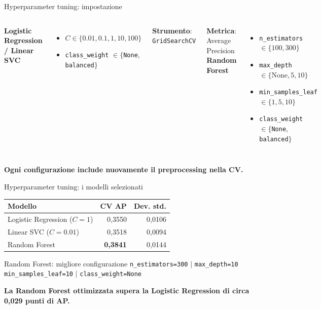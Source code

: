 \documentclass[10pt,aspectratio=169]{beamer}
\newcommand{\keypoint}[1]{\par\vspace{0.45em}\noindent{\color{teal}\rule{2.4pt}{1.25em}}\hspace{0.7em}\parbox[t]{0.92\linewidth}{\raggedright\textbf{#1}}}
\newcommand{\tightitems}{\setlength{\itemsep}{.5em}}
\begin{document}
\begin{frame}{Hyperparameter tuning: impostazione}
\begin{columns}[T,onlytextwidth]
\textbf{Logistic Regression / Linear SVC}
\begin{itemize}\tightitems
\item $C\in\{0.01,0.1,1,10,100\}$
\item \texttt{class\_weight} $\in\{$\texttt{None}, \texttt{balanced}$\}$
\end{itemize}
\vspace{.6em}
\textbf{Strumento}: \texttt{GridSearchCV}\par
\textbf{Metrica}: Average Precision
\textbf{Random Forest}
\begin{itemize}\tightitems
\item \texttt{n\_estimators} $\in\{100,300\}$
\item \texttt{max\_depth} $\in\{\mathrm{None},5,10\}$
\item \texttt{min\_samples\_leaf} $\in\{1,5,10\}$
\item \texttt{class\_weight} $\in\{$\texttt{None}, \texttt{balanced}$\}$
\end{itemize}
\end{columns}
\vspace{.45em}
\keypoint{Ogni configurazione include nuovamente il preprocessing nella CV.}
\end{frame}

\begin{frame}{Hyperparameter tuning: i modelli selezionati}
\centering
\begin{tabular}{@{}lrr@{}}\toprule
\textbf{Modello} & \textbf{CV AP} & \textbf{Dev. std.}\\\midrule
Logistic Regression ($C=1$) & 0,3550 & 0,0106\\
Linear SVC ($C=0.01$) & 0,3518 & 0,0094\\
\rowcolor{pale} Random Forest & \textbf{0,3841} & 0,0144\\\bottomrule\end{tabular}
\vspace{.85em}
\begin{block}{Random Forest: migliore configurazione}
\centering\texttt{n\_estimators=300} \; $\mid$ \; \texttt{max\_depth=10}\\
\texttt{min\_samples\_leaf=10} \; $\mid$ \; \texttt{class\_weight=None}
\end{block}
\keypoint{La Random Forest ottimizzata supera la Logistic Regression di circa 0,029 punti di AP.}
\end{frame}
\end{document}
